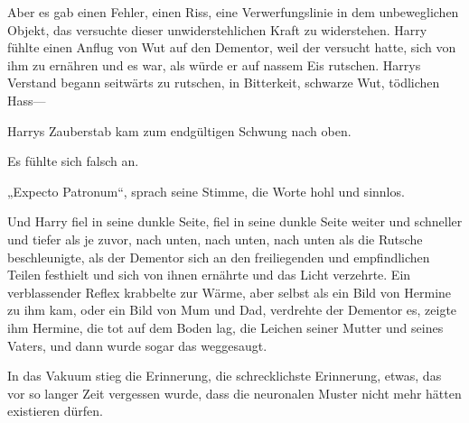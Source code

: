 Aber es gab einen Fehler, einen Riss, eine Verwerfungslinie in dem unbeweglichen Objekt, das versuchte dieser unwiderstehlichen Kraft zu widerstehen. Harry fühlte einen Anflug von Wut auf den Dementor, weil der versucht hatte, sich von ihm zu ernähren und es war, als würde er auf nassem Eis rutschen. Harrys Verstand begann seitwärts zu rutschen, in Bitterkeit, schwarze Wut, tödlichen Hass—

Harrys Zauberstab kam zum endgültigen Schwung nach oben.

Es fühlte sich falsch an.

„Expecto Patronum“, sprach seine Stimme, die Worte hohl und sinnlos.

Und Harry fiel in seine dunkle Seite, fiel in seine dunkle Seite weiter und schneller und tiefer als je zuvor, nach unten, nach unten, nach unten als die Rutsche beschleunigte, als der Dementor sich an den freiliegenden und empfindlichen Teilen festhielt und sich von ihnen ernährte und das Licht verzehrte. Ein verblassender Reflex krabbelte zur Wärme, aber selbst als ein Bild von Hermine zu ihm kam, oder ein Bild von Mum und Dad, verdrehte der Dementor es, zeigte ihm Hermine, die tot auf dem Boden lag, die Leichen seiner Mutter und seines Vaters, und dann wurde sogar das weggesaugt.

In das Vakuum stieg die Erinnerung, die schrecklichste Erinnerung, etwas, das vor so langer Zeit vergessen wurde, dass die neuronalen Muster nicht mehr hätten existieren dürfen.

